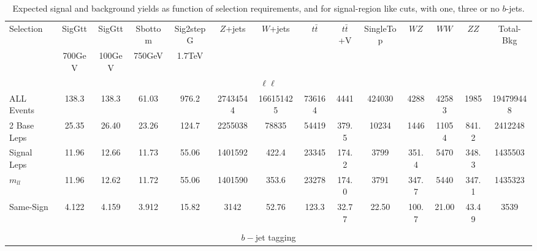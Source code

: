 \begin{table}
\caption{Expected signal and background yields as function of selection requirements, and for signal-region like cuts, with one, three or no $b$-jets.}
\label{tab:btagging_yields}
\begin{center}{\scriptsize
          \begin{tabular}{l||cccc||cc|ccc|ccc||c }
            Selection     &       SigGtt &    SigGtt    & Sbottom      & Sig2stepG    &  $Z$+jets    &  $W$+jets    &  $t\bar t$   & $t\bar t$+V  & SingleTop    & $WZ$         & $WW$         & $ZZ$         & Total-Bkg      \\ 
                          &   700GeV     &    100GeV    &  750GeV      &  1.7TeV      &              &              &              &              &              &              &              &              &                 \\ \hline 
            \multicolumn{14}{c}{$\ell\ell$} \\ \hline 
            ALL Events    &      138.3   &      138.3   &       61.03  &     976.2    & 27434544     & 166151425    &   736164     &     4441     &   424030     &     4288     &    42583     &     1985     & 194799448       \\ 
            2 Base Leps   &       25.35  &       26.40  &       23.26  &     124.7    &  2255038     &    78835     &    54419     &      379.5   &    10234     &     1446     &    11054     &      841.2   &  2412248        \\
            Signal Leps   &       11.96  &       12.66  &       11.73  &      55.06   &  1401592     &      422.4   &    23345     &      174.2   &     3799     &      351.4   &     5470     &      348.3   &  1435503        \\
            $m_{ll}$      &       11.96  &       12.62  &       11.72  &       55.06    & 1401590     &      353.6   &    23278     &      174.0   &     3791     &      347.7   &     5440     &      347.1   &  1435323        \\
            Same-Sign     &        4.122 &        4.159 &        3.912 &       15.82  &     3142     &       52.76  &      123.3   &       32.77  &       22.50  &      100.7   &       21.00  &       43.49  &     3539        \\ \hline\hline       
            \\
            \multicolumn{14}{c}{ $b-$jet tagging}  \\ \hline                                                                                                           

\end{tabular}}
\end{center}
\end{table}

